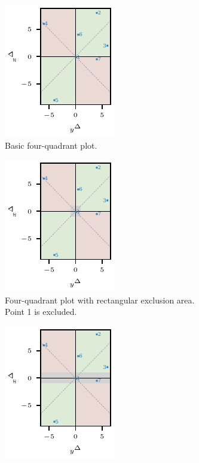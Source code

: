 \documentclass[pdflatex]{sn-jnl}
\theoremstyle{plain}%
\theoremstyle{definition}
\begin{document}
\begin{figure}
\centering
\begin{subfigure}[t]{.24\textwidth}
\includegraphics{plots/illustrative_examples/4Q_without_excl}
\caption{Basic four-quadrant plot.} \label{fig:aatc_basic_4q}
\end{subfigure}\hspace{0.01\textwidth}%
\begin{subfigure}[t]{.24\textwidth}
\includegraphics{plots/illustrative_examples/4q_excl_box}
\caption{Four-quadrant plot with rectangular exclusion area. Point 1 is excluded.}\label{fig:aatc_basic_4q_excl_box}
\end{subfigure}\hspace{0.01\textwidth}%
\begin{subfigure}[t]{.24\textwidth}
\includegraphics{plots/illustrative_examples/4q_excl_axis}

\end{subfigure}
\end{figure}
\end{document}
